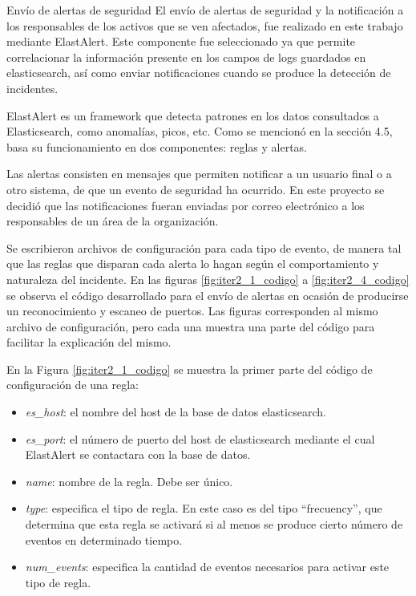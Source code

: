     \begin{section}{Envío de alertas de seguridad}
    El envío de alertas de seguridad y la notificación a los responsables de los activos que se ven afectados, fue realizado en este trabajo mediante ElastAlert. Este componente fue seleccionado ya que permite correlacionar la información presente en los campos de logs guardados en elasticsearch, así como enviar notificaciones cuando se produce la detección de incidentes. \par
    ElastAlert es un framework que detecta patrones en los datos consultados a Elasticsearch, como anomalías, picos, etc. Como se mencionó en la sección 4.5, basa su funcionamiento en dos componentes: reglas y alertas. \par
    Las alertas consisten en mensajes que permiten notificar a un usuario final o a otro sistema, de que un evento de seguridad ha ocurrido. En este proyecto se decidió que las notificaciones fueran enviadas por correo electrónico a los responsables de un área de la organización.\par
    Se escribieron archivos de configuración para cada tipo de evento, de manera tal que las reglas que disparan cada alerta lo hagan según el comportamiento y naturaleza del incidente. En las figuras \ref{fig:iter2_1_codigo} a \ref{fig:iter2_4_codigo} se observa el código desarrollado para el envío de alertas en ocasión de producirse un reconocimiento y escaneo de puertos. Las figuras corresponden al mismo archivo de configuración, pero cada una muestra una parte del código para facilitar la explicación del mismo.\par
    En la Figura \ref{fig:iter2_1_codigo} se muestra la primer parte del código de configuración de una regla:
    \begin{itemize}
        \item \textit{es\_host}: el nombre del host de la base de datos elasticsearch.
        \item \textit{es\_port}: el número de puerto del host de elasticsearch mediante el cual ElastAlert se contactara con la base de datos.
        \item \textit{name}: nombre de la regla. Debe ser único.
        \item \textit{type}: especifica el tipo de regla. En este caso es del tipo “frecuency”, que determina que esta regla se activará si al menos se produce cierto número de eventos en determinado tiempo.
        \item \textit{num\_events}: especifica la cantidad de eventos necesarios para activar este tipo de regla.

\end{itemize}
\end{section}
